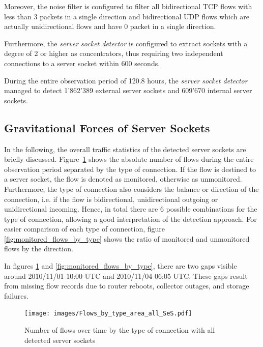 Moreover, the noise filter is configured to filter all bidirectional \gls{TCP} flows with less than 3 packets in a single direction and bidirectional \gls{UDP} flows which are actually unidirectional flows and have 0 packet in a single direction.

Furthermore, the \emph{server socket detector} is configured to extract sockets with a degree of 2 or higher as concentrators, thus requiring two independent connections to a \gls{server socket} within 600 seconds.

During the entire observation period of 120.8 hours, the \emph{server socket detector} managed to detect 1'862'389 external \glspl{server socket} and 609'670 internal \glspl{server socket}.

\subsection{Gravitational Forces of Server Sockets}
In the following, the overall traffic statistics of the detected \glspl{server socket} are briefly discussed. Figure \ref{fig:flows_by_type} shows the absolute number of flows during the entire observation period separated by the type of connection. 
If the flow is destined to a \gls{server socket}, the flow is denoted as monitored, otherwise as unmonitored.
Furthermore, the type of connection also considers the balance or direction of the connection, i.e. if the flow is bidirectional, unidirectional outgoing or unidirectional incoming. 
Hence, in total there are 6 possible combinations for the type of connection, allowing a good interpretation of the detection approach.
For easier comparison of each type of connection, figure \ref{fig:monitored_flows_by_type} shows the ratio of monitored and unmonitored flows by the direction.

In figures \ref{fig:flows_by_type} and \ref{fig:monitored_flows_by_type}, there are two gaps visible around 2010/11/01 10:00 UTC and 2010/11/04 06:05 UTC. 
These gaps result from missing flow records due to router reboots, collector outages, and storage failures\citep{Schatzmann:Mining}.

\begin{figure}
	[ht] \centering
	\texttt{[image: images/Flows\_by\_type\_area\_all\_SeS.pdf]}
	\caption{Number of flows over time by the type of connection with all detected server sockets}
	\label{fig:flows_by_type}
\end{figure}

